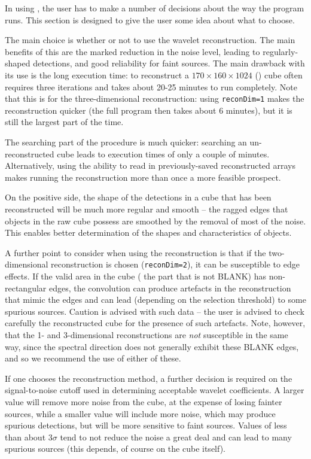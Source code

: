 \label{sec-notes}

In using \duchamp, the user has to make a number of decisions about
the way the program runs. This section is designed to give the user
some idea about what to choose.

The main choice is whether or not to use the wavelet
reconstruction. The main benefits of this are the marked reduction in
the noise level, leading to regularly-shaped detections, and good
reliability for faint sources. The main drawback with its use is the
long execution time: to reconstruct a $170\times160\times1024$
(\hipass) cube often requires three iterations and takes about 20-25
minutes to run completely. Note that this is for the three-dimensional
reconstruction: using \texttt{reconDim=1} makes the reconstruction
quicker (the full program then takes about 6 minutes), but it is still
the largest part of the time.

The searching part of the procedure is much quicker: searching an
un-reconstructed cube leads to execution times of only a couple of
minutes. Alternatively, using the ability to read in previously-saved
reconstructed arrays makes running the reconstruction more than once a
more feasible prospect.

On the positive side, the shape of the detections in a cube that has
been reconstructed will be much more regular and smooth -- the ragged
edges that objects in the raw cube possess are smoothed by the removal
of most of the noise. This enables better determination of the shapes
and characteristics of objects.

A further point to consider when using the reconstruction is that if
the two-dimensional reconstruction is chosen (\texttt{reconDim=2}), it
can be susceptible to edge effects. If the valid area in the cube (\ie
the part that is not BLANK) has non-rectangular edges, the convolution
can produce artefacts in the reconstruction that mimic the edges and
can lead (depending on the selection threshold) to some spurious
sources. Caution is advised with such data -- the user is advised to
check carefully the reconstructed cube for the presence of such
artefacts. Note, however, that the 1- and 3-dimensional
reconstructions are \emph{not} susceptible in the same way, since the
spectral direction does not generally exhibit these BLANK edges, and
so we recommend the use of either of these.

If one chooses the reconstruction method, a further decision is
required on the signal-to-noise cutoff used in determining acceptable
wavelet coefficients. A larger value will remove more noise from the
cube, at the expense of losing fainter sources, while a smaller value
will include more noise, which may produce spurious detections, but
will be more sensitive to faint sources. Values of less than about
$3\sigma$ tend to not reduce the noise a great deal and can lead to
many spurious sources (this depends, of course on the cube itself).

